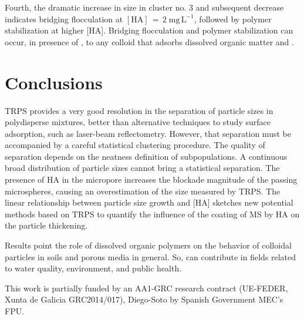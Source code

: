 \documentclass[journal=langd5,manuscript=article]{achemso}
\begin{document}
Fourth, the dramatic increase in size in cluster no. 3 
and subsequent decrease indicates bridging flocculation at 
$\mathrm{[HA] \,=\, 2\;mg\,L^{-1}}$, followed by polymer stabilization at higher [HA]. %
Bridging flocculation and polymer stabilization can occur, in presence of , to any colloid that adsorbs dissolved organic matter and .


\section{Conclusions}


TRPS provides a very good resolution in the separation  of particle sizes in polydisperse mixtures, better than alternative techniques to study surface adsorption, such as laser-beam reflectometry. However, that separation must be accompanied by a careful statistical clustering procedure. The quality of separation depends on the neatness definition of subpopulations. A continuous broad distribution of particle sizes cannot bring a statistical separation.
The presence of HA in the micropore increases the blockade magnitude of the passing microspheres, causing an overestimation of the size measured by TRPS.  The linear relationship  between particle size growth and [HA] sketches new potential methods based on TRPS to quantify the influence of the coating of MS by HA on the particle thickening.

Results  point the role of dissolved organic polymers on the behavior of colloidal particles in soils and porous media in general. So, can contribute in fields related to 
water quality, environment, and public health.



\begin{acknowledgement}

This
work is partially funded by an AA1-GRC research contract (UE-FEDER,
Xunta de Galicia GRC2014/017), Diego-Soto by Spanish Government MEC’s FPU.

\end{acknowledgement}
\end{document}
